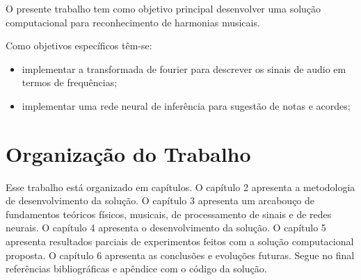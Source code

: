 O presente trabalho tem como objetivo principal desenvolver uma solução computacional para reconhecimento de harmonias musicais.

Como objetivos específicos têm-se:

 	\begin{itemize}
        \item implementar a transformada de fourier para descrever os sinais de audio em termos de frequências;
        \item implementar uma rede neural de inferência para sugestão de notas e acordes;
    \end{itemize}

\section{Organização do Trabalho}
\label{sec:organizacao}

Esse trabalho está organizado em capítulos. O capítulo 2 apresenta a metodologia de desenvolvimento da solução. O capítulo 3 apresenta um arcabouço de fundamentos teóricos físicos, musicais, de processamento de sinais e de redes neurais. O capítulo 4 apresenta o desenvolvimento da solução. O capítulo 5 apresenta resultados parciais de experimentos feitos com a solução computacional proposta. O capítulo 6 apresenta as conclusões e evoluções futuras. Segue no final referências bibliográficas e apêndice com o código da solução.

